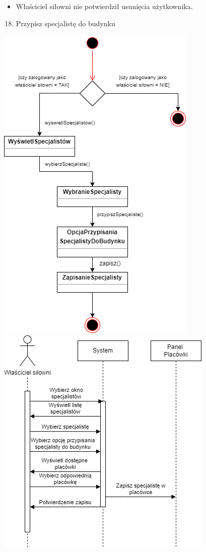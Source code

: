 \begin{itemize}
\tightlist
\item
  {Właściciel siłowni nie potwierdził usunięcia użytkownika. }
\end{itemize}

{}

{}

\begin{enumerate}
\setcounter{enumi}{17}
\tightlist
\item
  {Przypisz specjalistę do budynku}
\end{enumerate}

{\includegraphics{../diagrams/state/przypisz_specjaliste_budynku}}
{\includegraphics{../diagrams/sequence/przypisz_speca_sekw}}

